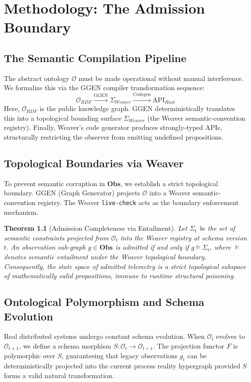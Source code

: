 \documentclass[12pt,a4paper,oneside]{book}
\newtheorem{theorem}{Theorem}[chapter]
\begin{document}
\chapter{Methodology: The Admission Boundary}

\section{The Semantic Compilation Pipeline}
The abstract ontology $\mathcal{O}$ must be made operational without manual interference. We formalize this via the GGEN compiler transformation sequence:
$$ \mathcal{O}_{RDF} \xrightarrow{\text{GGEN}} \Sigma_{Weaver} \xrightarrow{\text{Codegen}} \text{API}_{Rust} $$
Here, $\mathcal{O}_{RDF}$ is the public knowledge graph. GGEN deterministically translates this into a topological bounding surface $\Sigma_{Weaver}$ (the Weaver semantic-convention registry). Finally, Weaver's code generator produces strongly-typed APIs, structurally restricting the observer from emitting undefined propositions.

\section{Topological Boundaries via Weaver}
To prevent semantic corruption in $\mathbf{Obs}$, we establish a strict topological boundary. GGEN (Graph Generator) projects $\mathcal{O}$ into a Weaver semantic-convention registry. The Weaver \texttt{live-check} acts as the boundary enforcement mechanism.

\begin{theorem}[Admission Completeness via Entailment]
Let $\Sigma_t$ be the set of semantic constraints projected from $\mathcal{O}_t$ into the Weaver registry at schema version $t$. An observation sub-graph $g \in \mathbf{Obs}$ is admitted if and only if $g \models \Sigma_t$, where $\models$ denotes semantic entailment under the Weaver topological boundary. Consequently, the state space of admitted telemetry is a strict topological subspace of mathematically valid propositions, immune to runtime structural poisoning.
\end{theorem}

\section{Ontological Polymorphism and Schema Evolution}
Real distributed systems undergo constant schema evolution. When $\mathcal{O}_t$ evolves to $\mathcal{O}_{t+1}$, we define a schema morphism $S: \mathcal{O}_t \to \mathcal{O}_{t+1}$. The projection functor $F$ is polymorphic over $S$, guaranteeing that legacy observations $g_t$ can be deterministically projected into the current process reality hypergraph provided $S$ forms a valid natural transformation.
\end{document}
